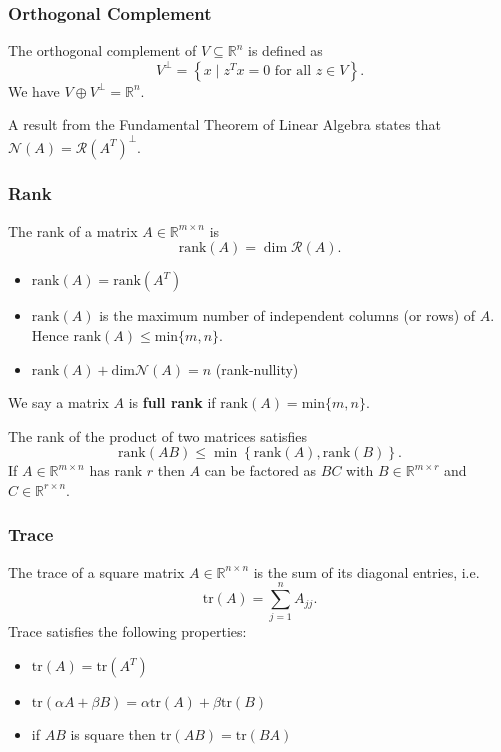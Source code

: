 \documentclass[11pt]{article}
\begin{document}
\subsubsection*{Orthogonal Complement}
The orthogonal complement of $V \subseteq \mathbb{R}^n$ is defined as 
\[ V^\perp = \left\{ x \mid z^Tx = 0 \text{ for all }  z\in V \right\}. \] 
We have $V \oplus V^\perp = \mathbb{R}^n$. \par

A result from the Fundamental Theorem of Linear Algebra states that $\mathcal{N}(A) = \mathcal{R}(A^T)^\perp$.

\subsubsection*{Rank}
The rank of a matrix $A \in \mathbb{R}^{m\times n}$ is 
\[ \mathrm{rank}(A) = \dim \mathcal{R}(A). \] 

\begin{itemize}
    \item $\mathrm{rank}(A) = \mathrm{rank}(A^T)$ 
    \item $\mathrm{rank}(A)$ is the maximum number of independent columns (or rows) of $A$. Hence $\mathrm{rank}(A) \leq \mathrm{min}\{m, n\}$. 
    \item $\mathrm{rank}(A) + \mathrm{dim}\mathcal{N}(A) = n$ (rank-nullity)
\end{itemize}
We say a matrix $A$ is \textbf{full rank} if $\mathrm{rank}(A) = \mathrm{min}\{m, n\}$. \par

The rank of the product of two matrices satisfies 
\[ \mathrm{rank}(AB) \leq \min\left\{ \mathrm{rank}(A), \mathrm{rank}(B) \right\}. \] 
If $A \in \mathbb{R}^{m\times n}$ has rank $r$ then $A$ can be factored as $BC$ with $B \in \mathbb{R}^{m\times r}$ and $C \in \mathbb{R}^{r \times n}$. 

\subsubsection*{Trace}
The trace of a square matrix $A \in \mathbb{R}^{n\times n}$ is the sum of its diagonal entries, i.e. 
\[ \mathrm{tr}(A) = \sum_{j=1}^n A_{jj}. \] 
Trace satisfies the following properties: 
\begin{itemize}
    \item $\mathrm{tr}(A) = \mathrm{tr}(A^T)$
    \item $\mathrm{tr}(\alpha A + \beta B) = \alpha\mathrm{tr}(A) + \beta\mathrm{tr}(B)$
    \item if $AB$ is square then $\mathrm{tr}(AB) = \mathrm{tr}(BA)$
\end{itemize}
\end{document}
